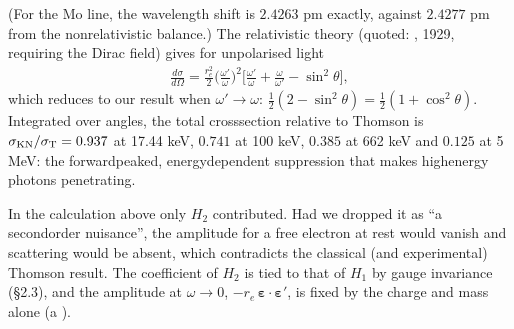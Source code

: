 \documentclass[letterpaper,10pt,english]{jupyterBook}
\begin{document}
\sphinxAtStartPar
(For the Mo line, the wavelength shift is \(2.4263\) pm exactly, against \(2.4277\) pm from the non\sphinxhyphen{}relativistic balance.) The relativistic theory (quoted: , 1929, requiring the Dirac field) gives for unpolarised light
\begin{equation*}
\begin{split}
\frac{d\sigma}{d\Omega}=\frac{r_e^2}{2}\Big(\frac{\omega'}{\omega}\Big)^2\Big[\frac{\omega'}{\omega}+\frac{\omega}{\omega'}-\sin^2\theta\Big],
\end{split}
\end{equation*}
\sphinxAtStartPar
which reduces to our result when \(\omega'\to\omega\): \(\tfrac12(2-\sin^2\theta)=\tfrac12(1+\cos^2\theta)\). Integrated over angles, the total cross\sphinxhyphen{}section relative to Thomson is \(\sigma_{\rm KN}/\sigma_{\rm T}=0.937\) at 17.44 keV, \(0.741\) at 100 keV, \(0.385\) at 662 keV and \(0.125\) at 5 MeV: the forward\sphinxhyphen{}peaked, energy\sphinxhyphen{}dependent suppression that makes high\sphinxhyphen{}energy photons penetrating.

\sphinxAtStartPar
{} In the calculation above only \(H_2\) contributed. Had we dropped it as “a second\sphinxhyphen{}order nuisance”, the amplitude for a free electron at rest would vanish and scattering would be absent, which contradicts the classical (and experimental) Thomson result. The coefficient of \(H_2\) is tied to that of \(H_1\) by gauge invariance (§2.3), and the amplitude at \(\omega\to0\), \(-r_e\,\boldsymbol\varepsilon\!\cdot\!\boldsymbol\varepsilon'\), is fixed by the charge and mass alone (a ).
\end{document}
